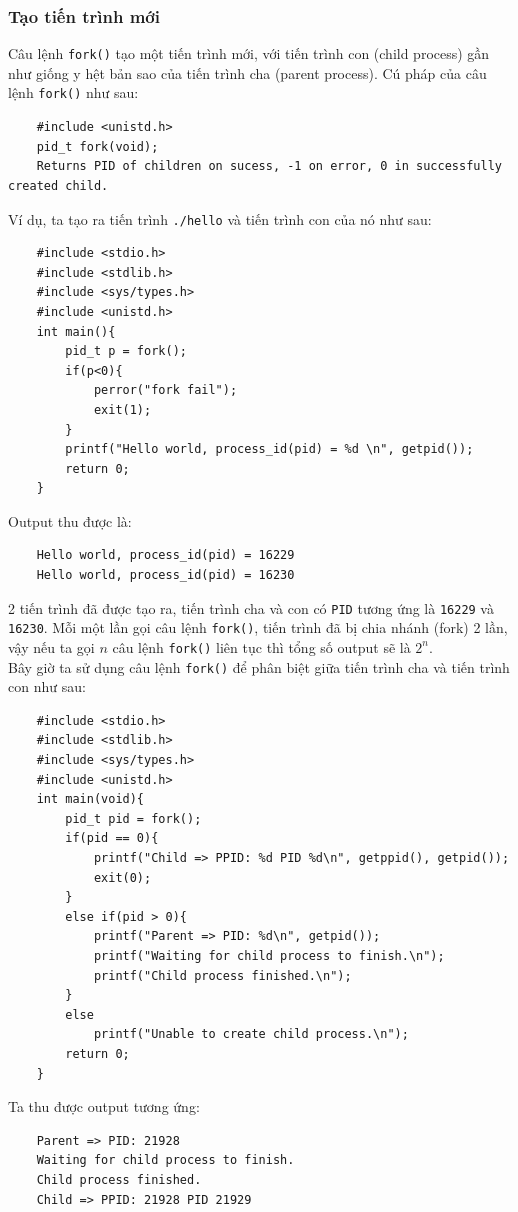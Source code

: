 \documentclass{article}
\begin{document}
\subsubsection{Tạo tiến trình mới}
Câu lệnh \verb|fork()| tạo một tiến trình mới, với tiến trình con (child process) gần như giống y hệt bản sao của tiến trình cha (parent process).
Cú pháp của câu lệnh \verb|fork()| như sau:
\begin{verbatim}
    #include <unistd.h>
    pid_t fork(void);
    Returns PID of children on sucess, -1 on error, 0 in successfully created child.
\end{verbatim}
Ví dụ, ta tạo ra tiến trình \verb|./hello| và tiến trình con của nó như sau:
\begin{verbatim}
    #include <stdio.h>
    #include <stdlib.h>
    #include <sys/types.h>
    #include <unistd.h>
    int main(){
        pid_t p = fork();
        if(p<0){
            perror("fork fail");
            exit(1);
        }
        printf("Hello world, process_id(pid) = %d \n", getpid());
        return 0;
    }    
\end{verbatim}
Output thu được là:
\begin{verbatim}
    Hello world, process_id(pid) = 16229 
    Hello world, process_id(pid) = 16230 
\end{verbatim}
2 tiến trình đã được tạo ra, tiến trình cha và con có \verb|PID| tương ứng là \verb|16229| và \verb|16230|. Mỗi một lần gọi câu lệnh \verb|fork()|, tiến trình
đã bị chia nhánh (fork) 2 lần, vậy nếu ta gọi $n$ câu lệnh \verb|fork()| liên tục thì tổng số output sẽ là $2^n$.
\\ Bây giờ ta sử dụng câu lệnh \verb|fork()| để phân biệt giữa tiến trình cha và tiến trình con như sau:
\begin{verbatim}
    #include <stdio.h>
    #include <stdlib.h>
    #include <sys/types.h>
    #include <unistd.h>
    int main(void){
        pid_t pid = fork();
        if(pid == 0){
            printf("Child => PPID: %d PID %d\n", getppid(), getpid());
            exit(0);
        }
        else if(pid > 0){
            printf("Parent => PID: %d\n", getpid());
            printf("Waiting for child process to finish.\n");
            printf("Child process finished.\n");
        }
        else
            printf("Unable to create child process.\n");
        return 0;
    }    
\end{verbatim}
Ta thu được output tương ứng:
\begin{verbatim}
    Parent => PID: 21928
    Waiting for child process to finish.
    Child process finished.
    Child => PPID: 21928 PID 21929    
\end{verbatim}
\end{document}
